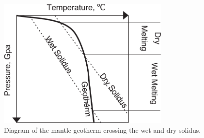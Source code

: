 \begin{figure}
\centering
\includegraphics[width=8.6cm]{./figures/ch2-solidi-geotherm.pdf}
\caption{Diagram of the mantle geotherm crossing the wet and dry solidus.}
\label{fg:solidus}
\end{figure}


